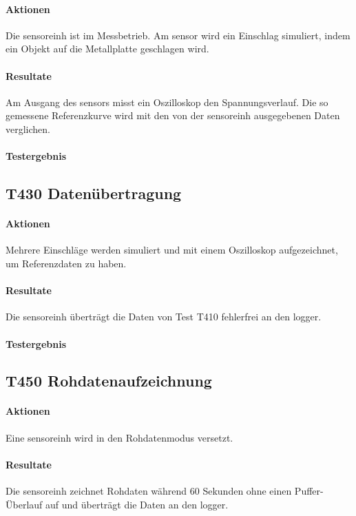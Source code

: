 \paragraph{Aktionen} Die \gls{sensoreinh} ist im Messbetrieb. Am \gls{sensor} wird ein Einschlag simuliert, indem ein Objekt auf die Metallplatte geschlagen wird. 

\paragraph{Resultate} Am Ausgang des \gls{sensor}s misst ein Oszilloskop den Spannungsverlauf. Die so gemessene Referenzkurve wird mit den von der \gls{sensoreinh} ausgegebenen Daten verglichen.

\paragraph{Testergebnis} 

\subsection{T430 Datenübertragung}
\paragraph{Aktionen} Mehrere Einschläge werden simuliert und mit einem Oszilloskop aufgezeichnet, um Referenzdaten zu haben.

\paragraph{Resultate} Die \gls{sensoreinh} überträgt die Daten von Test T410 fehlerfrei an den \gls{logger}.

\paragraph{Testergebnis} 

\subsection{T450 Rohdatenaufzeichnung}
\paragraph{Aktionen} Eine \gls{sensoreinh} wird in den Rohdatenmodus versetzt.

\paragraph{Resultate} Die \gls{sensoreinh} zeichnet Rohdaten während 60 Sekunden ohne einen Puffer-Überlauf auf und überträgt die Daten an den \gls{logger}.

